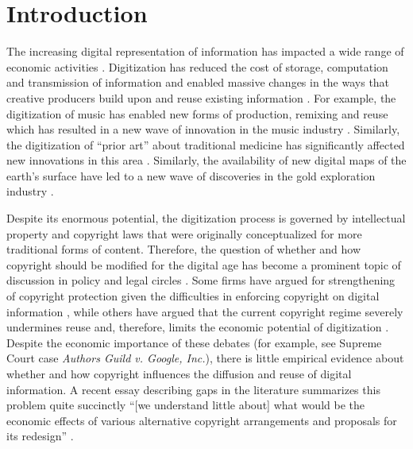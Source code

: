 \documentclass[11pt]{article}
\begin{document}
\setcounter{page}{1}

\newpage
\section{Introduction}

The increasing digital representation of information has impacted a wide range of economic activities \citep{greenstein_digitization_2013}. Digitization has reduced the cost of storage, computation and transmission of information and enabled massive changes in the ways that creative producers build upon and reuse existing information  \citep{goldfarb_introduction_2014}. For example, the digitization of music has enabled new forms of production, remixing and reuse which has resulted in a new wave of innovation in the music industry \citep{waldfogel_digitization_2014}. Similarly, the digitization of ``prior art'' about traditional medicine has significantly affected new innovations in this area \citep{choudhury_ex-ante_2015}. Similarly, the availability of new digital maps of the earth's surface have led to a new wave of discoveries in the gold exploration industry \citep{nagaraj_private_2015}.

Despite its enormous potential, the digitization process is governed by intellectual property and copyright laws that were originally conceptualized for more traditional forms of content. Therefore, the question of whether and how copyright should be modified for the digital age has become a prominent topic of discussion in policy and legal circles \citep{merges_intellectual_2012}. Some firms have argued for strengthening of copyright protection given the difficulties in enforcing copyright on digital information \citep{anderson_new_2007}, while others have argued that the current copyright regime severely undermines reuse and, therefore, limits the economic potential of digitization \citep{samuelson_intellectual_1999, lessig_free_2004}. Despite the economic importance of these debates (for example, see Supreme Court case \emph{Authors Guild v. Google, Inc.}), there is little empirical evidence about whether and how copyright influences the diffusion and reuse of digital information. A recent essay describing gaps in the literature summarizes this problem quite succinctly ``[we understand little about] what would be the economic effects of various alternative copyright arrangements and proposals for its redesign'' \citep{greenstein_digitization_2013}.
\end{document}
